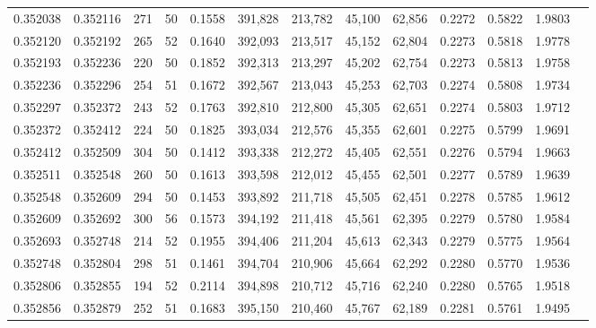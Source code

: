 \begin{tabular}{rrrrrrrrrrrrr}
0.352038 & 0.352116 &   271 &  50 &                                     0.1558 & 391,828 & 213,782 &  45,100 &  62,856 & 0.2272 & 0.5822 & 1.9803 \\
0.352120 & 0.352192 &   265 &  52 &                                     0.1640 & 392,093 & 213,517 &  45,152 &  62,804 & 0.2273 & 0.5818 & 1.9778 \\
0.352193 & 0.352236 &   220 &  50 &                                     0.1852 & 392,313 & 213,297 &  45,202 &  62,754 & 0.2273 & 0.5813 & 1.9758 \\
0.352236 & 0.352296 &   254 &  51 &                                     0.1672 & 392,567 & 213,043 &  45,253 &  62,703 & 0.2274 & 0.5808 & 1.9734 \\
0.352297 & 0.352372 &   243 &  52 &                                     0.1763 & 392,810 & 212,800 &  45,305 &  62,651 & 0.2274 & 0.5803 & 1.9712 \\
0.352372 & 0.352412 &   224 &  50 &                                     0.1825 & 393,034 & 212,576 &  45,355 &  62,601 & 0.2275 & 0.5799 & 1.9691 \\
0.352412 & 0.352509 &   304 &  50 &                                     0.1412 & 393,338 & 212,272 &  45,405 &  62,551 & 0.2276 & 0.5794 & 1.9663 \\
0.352511 & 0.352548 &   260 &  50 &                                     0.1613 & 393,598 & 212,012 &  45,455 &  62,501 & 0.2277 & 0.5789 & 1.9639 \\
0.352548 & 0.352609 &   294 &  50 &                                     0.1453 & 393,892 & 211,718 &  45,505 &  62,451 & 0.2278 & 0.5785 & 1.9612 \\
0.352609 & 0.352692 &   300 &  56 &                                     0.1573 & 394,192 & 211,418 &  45,561 &  62,395 & 0.2279 & 0.5780 & 1.9584 \\
0.352693 & 0.352748 &   214 &  52 &                                     0.1955 & 394,406 & 211,204 &  45,613 &  62,343 & 0.2279 & 0.5775 & 1.9564 \\
0.352748 & 0.352804 &   298 &  51 &                                     0.1461 & 394,704 & 210,906 &  45,664 &  62,292 & 0.2280 & 0.5770 & 1.9536 \\
0.352806 & 0.352855 &   194 &  52 &                                     0.2114 & 394,898 & 210,712 &  45,716 &  62,240 & 0.2280 & 0.5765 & 1.9518 \\
0.352856 & 0.352879 &   252 &  51 &                                     0.1683 & 395,150 & 210,460 &  45,767 &  62,189 & 0.2281 & 0.5761 & 1.9495 \\

\end{tabular}
